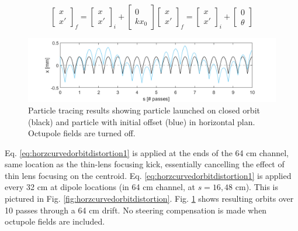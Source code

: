 \begin{subequations}
\begin{equation}
\begin{bmatrix} x \\ x' \end{bmatrix}_f = \begin{bmatrix} x \\ x' \end{bmatrix}_i + \begin{bmatrix} 0 \\ kx_0 \end{bmatrix}
\label{eq:horzcurvedorbitdistortion1}
\end{equation}
\begin{equation}
\begin{bmatrix} x \\ x' \end{bmatrix}_f = \begin{bmatrix} x \\ x' \end{bmatrix}_i + \begin{bmatrix} 0 \\ \theta \end{bmatrix}
\label{eq:horzcurvedorbitdistortion2}
\end{equation}
\end{subequations}

\begin{figure}
\centering
\includegraphics[width=\textwidth]{7.figures/steeringtolerance/sp_traces.png}
\caption{Particle tracing results showing particle launched on closed orbit (black) and particle with initial offset (blue) in horizontal plan. Octupole fields are turned off.}
\label{fig:horsptraces}
\end{figure}

Eq. \ref{eq:horzcurvedorbitdistortion1} is applied at the ends of the 64 cm channel, same location as the thin-lens focusing kick, essentially cancelling the effect of thin lens focusing on the centroid. Eq. \ref{eq:horzcurvedorbitdistortion1} is applied every 32 cm at dipole locations (in 64 cm channel, at $s=16,48$ cm). This is pictured in Fig. \ref{fig:horzcurvedorbitdistortion}. Fig. \ref{fig:horsptraces} shows resulting orbits over 10 passes through a 64 cm drift. No steering compensation is made when octupole fields are included.

